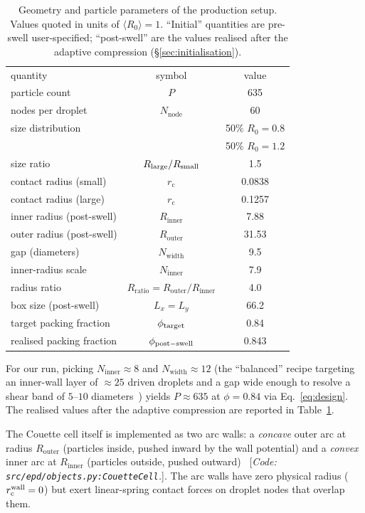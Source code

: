 \documentclass[aps,pre,twocolumn,floatfix,longbibliography]{revtex4-2}
\newcommand{\rc}{r_{\mathrm{c}}}
\newcommand{\Ninner}{N_{\mathrm{inner}}}
\newcommand{\Nwidth}{N_{\mathrm{width}}}
\newcommand{\Rinner}{R_{\mathrm{inner}}}
\newcommand{\Router}{R_{\mathrm{outer}}}
\newcommand{\Rratio}{R_{\mathrm{ratio}}}
\begin{document}
\begin{table}[t]
\caption{Geometry and particle parameters of the production setup.
Values quoted in units of $\langle R_0 \rangle = 1$.  ``Initial''
quantities are pre-swell user-specified; ``post-swell'' are the values
realised after the adaptive compression
(\S\ref{sec:initialisation}).}
\label{tab:setup}
\begin{ruledtabular}
\begin{tabular}{lcc}
quantity & symbol & value \\
\colrule
particle count & $P$ & 635 \\
nodes per droplet & $N_{\mathrm{node}}$ & 60 \\
size distribution &
  & 50\% $R_0=0.8$ \\
  & & 50\% $R_0=1.2$ \\
size ratio & $R_{\rm large}/R_{\rm small}$ & 1.5 \\
contact radius (small) & $\rc$ & 0.0838 \\
contact radius (large) & $\rc$ & 0.1257 \\
\colrule
inner radius (post-swell) & $\Rinner$ & 7.88 \\
outer radius (post-swell) & $\Router$ & 31.53 \\
gap (diameters) & $\Nwidth$ & 9.5 \\
inner-radius scale & $\Ninner$ & 7.9 \\
radius ratio & $\Rratio = \Router / \Rinner$ & 4.0 \\
box size (post-swell) & $L_x = L_y$ & 66.2 \\
\colrule
target packing fraction & $\phi_{\rm target}$ & 0.84 \\
realised packing fraction & $\phi_{\rm post-swell}$ & 0.843 \\
\end{tabular}
\end{ruledtabular}
\end{table}

For our run, picking $\Ninner \approx 8$ and $\Nwidth \approx 12$ (the
``balanced'' recipe targeting an inner-wall layer of $\approx 25$
driven droplets and a gap wide enough to resolve a shear band of
$5$--$10$ diameters~\cite{mueth2000signatures,coussot2002viscosity})
yields $P \approx 635$ at $\phi = 0.84$ via Eq.~\ref{eq:design}.  The
realised values after the adaptive compression are reported in
Table~\ref{tab:setup}.

The Couette cell itself is implemented as two arc walls: a
\emph{concave} outer arc at radius $\Router$ (particles inside, pushed
inward by the wall potential) and a \emph{convex} inner arc at
$\Rinner$ (particles outside, pushed
outward)~ [\textit{Code: \texttt{src/epd/objects.py:CouetteCell}.}].
The arc walls have zero physical radius ($\rc^{\rm wall} = 0$) but
exert linear-spring contact forces on droplet nodes that overlap them.
\end{document}
